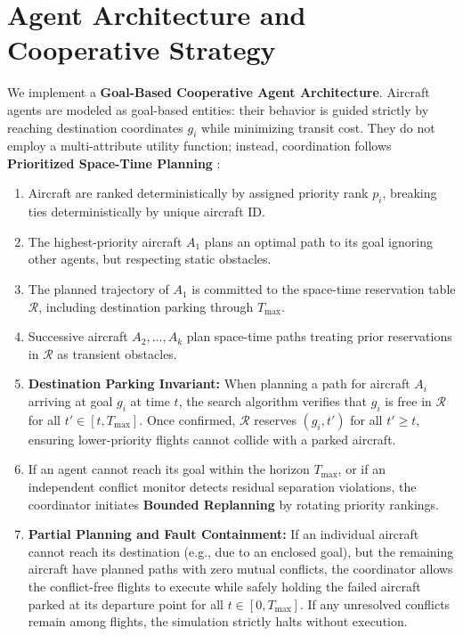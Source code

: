 \documentclass[11pt,a4paper]{article}
\begin{document}
\section{Agent Architecture and Cooperative Strategy}
We implement a \textbf{Goal-Based Cooperative Agent Architecture}. Aircraft agents are modeled as goal-based entities: their behavior is guided strictly by reaching destination coordinates $g_i$ while minimizing transit cost. They do not employ a multi-attribute utility function; instead, coordination follows \textbf{Prioritized Space-Time Planning} \cite{silver2005}:
\begin{enumerate}
    \item Aircraft are ranked deterministically by assigned priority rank $p_i$, breaking ties deterministically by unique aircraft ID.
    \item The highest-priority aircraft $A_1$ plans an optimal path to its goal ignoring other agents, but respecting static obstacles.
    \item The planned trajectory of $A_1$ is committed to the space-time reservation table $\mathcal{R}$, including destination parking through $T_{\max}$.
    \item Successive aircraft $A_2, \dots, A_k$ plan space-time paths treating prior reservations in $\mathcal{R}$ as transient obstacles.
    \item \textbf{Destination Parking Invariant:} When planning a path for aircraft $A_i$ arriving at goal $g_i$ at time $t$, the search algorithm verifies that $g_i$ is free in $\mathcal{R}$ for all $t' \in [t, T_{\max}]$. Once confirmed, $\mathcal{R}$ reserves $(g_i, t')$ for all $t' \ge t$, ensuring lower-priority flights cannot collide with a parked aircraft.
    \item If an agent cannot reach its goal within the horizon $T_{\max}$, or if an independent conflict monitor detects residual separation violations, the coordinator initiates \textbf{Bounded Replanning} by rotating priority rankings.
    \item \textbf{Partial Planning and Fault Containment:} If an individual aircraft cannot reach its destination (e.g., due to an enclosed goal), but the remaining aircraft have planned paths with zero mutual conflicts, the coordinator allows the conflict-free flights to execute while safely holding the failed aircraft parked at its departure point for all $t \in [0, T_{\max}]$. If any unresolved conflicts remain among flights, the simulation strictly halts without execution.
\end{enumerate}
\end{document}
